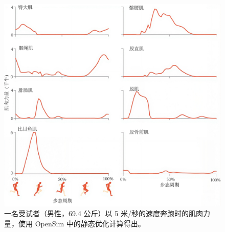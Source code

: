 \begin{figure}[!htb]
	\centering
	\includegraphics[width=1.0\linewidth]{chap9/9_12}
	\caption{一名受试者（男性，69.4 公斤）以 5 米/秒的速度奔跑时的肌肉力量，使用 OpenSim 中的静态优化计算得出\cite{hamner2013muscle}。 \label{fig:9_12}}
\end{figure}


